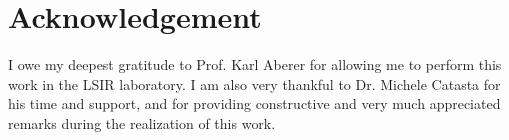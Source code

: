 \documentclass[10pt, a4paper, twocolumn]{article} %
\begin{document}
 

\section*{Acknowledgement}

I owe my deepest gratitude to Prof. Karl Aberer for allowing me to perform this work in the LSIR laboratory. I am also very thankful to Dr. Michele Catasta for his time and support, and for providing constructive and very much appreciated remarks during the realization of this work.

  
\end{document}
